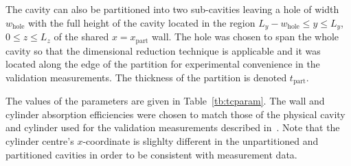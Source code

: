 \documentclass[a4paper]{article}
\numberwithin{equation}{section}
\newcounter{Table}
\begin{document}
The cavity can also be partitioned into two sub-cavities leaving a hole of width
$w_\mathrm{hole}$ with the full height of the cavity located in the region 
$L_y-w_\mathrm{hole} \leq y \leq L_y$, $0 \leq z \leq L_z$ of the shared 
$x=x_\mathrm{part}$ wall. The hole was chosen to span the whole cavity so that the 
dimensional reduction technique is applicable and it was located along the edge of the 
partition for experimental convenience in the validation measurements.
The thickness of the partition is denoted $t_\mathrm{part}$.

The values of the parameters are given in Table~\ref{tb:tcparam}. The wall and cylinder
absorption efficiencies were chosen to match those of the physical cavity and
cylinder used for the validation measurements described in~\citep{Flintoft2017b}.
Note that the cylinder centre's $x$-coordinate is slighlty different in the unpartitioned
and partitioned cavities in order to be consistent with measurement data. 
\end{document}
